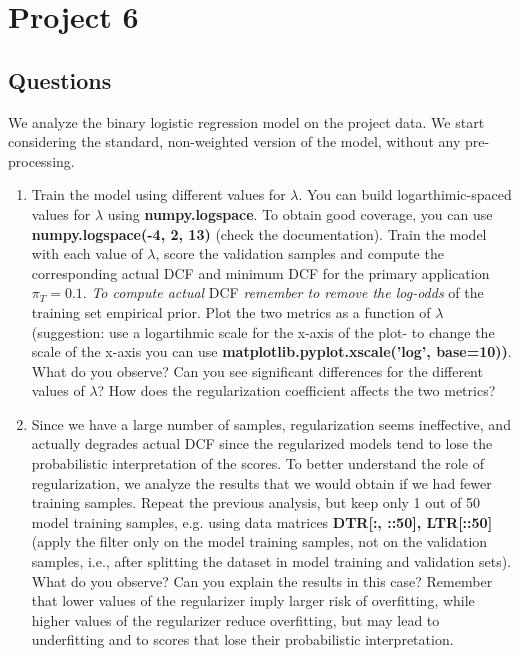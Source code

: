 \documentclass[a4paper, 12pt, english]{article}
\begin{document}
    \newpage


    \section{Project 6}

    \subsection{Questions}
    We analyze the binary logistic regression model on the project data. We start considering the standard, non-weighted version of the model, without any pre-processing.
    \begin{enumerate}
        \item Train the model using different values for \(\lambda\). You can build logarthimic-spaced values for \(\lambda\) using \textbf{numpy.logspace}. To obtain good coverage, you can use \textbf{numpy.logspace(-4, 2, 13)} (check the documentation). Train the model with each value of \(\lambda\), score the validation samples and compute the corresponding actual DCF and minimum DCF for the primary application \(\pi_T = 0.1\). \textit{To compute actual} DCF \textit{remember to remove the log-odds} of the training set empirical prior. Plot the two metrics as a function of \(\lambda\) (suggestion: use a logartihmic scale for the x-axis of the plot- to change the scale of the x-axis you can use \textbf{matplotlib.pyplot.xscale(’log’, base=10))}. What do you observe? Can you see significant differences for the different values of \(\lambda\)? How does the regularization coefficient affects the two metrics?
        \item Since we have a large number of samples, regularization seems ineffective, and actually degrades actual DCF since the regularized models tend to lose the probabilistic interpretation of the scores. To better understand the role of regularization, we analyze the results that we would obtain if we had fewer training samples. Repeat the previous analysis, but keep only 1 out of 50 model training samples, e.g. using data matrices \textbf{DTR[:, ::50], LTR[::50]} (apply the filter only on the model training samples, not on the validation samples, i.e., after splitting the dataset in model training and validation sets). What do you observe? Can you explain the results in this case? Remember that lower values of the regularizer imply larger risk of overfitting, while higher values of the regularizer reduce overfitting, but may lead to underfitting and to scores that lose their probabilistic interpretation.

\end{enumerate}
\end{document}
